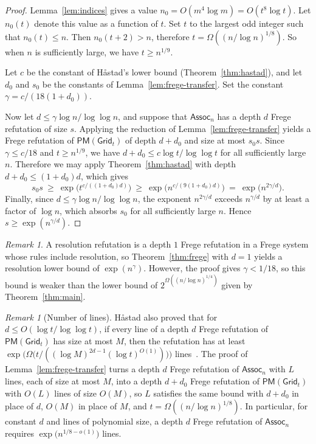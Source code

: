 \documentclass[11pt]{article}
\theoremstyle{definition}
\theoremstyle{remark}
\newtheorem{remark}[theorem]{Remark}
\newcommand{\Assoc}{\mathsf{Assoc}}
\newcommand{\PM}{\mathsf{PM}}
\newcommand{\Grid}{\mathsf{Grid}}
\begin{document}
\begin{proof}
Lemma~\ref{lem:indices} gives a value $n_0=O(m^4\log m)=O(t^8 \log t)$. Let $n_0(t)$ denote this value as a function of $t$.
Set $t$ to the largest odd integer such that $n_0(t)\le n$. Then $n_0(t+2) > n$, therefore $t=\Omega((n/\log n)^{1/8})$. So when $n$ is sufficiently large, we have $t \ge n^{1/9}$. 

Let $c$ be the constant of H\r{a}stad's lower bound (Theorem~\ref{thm:hastad}), and let $d_0$ and $s_0$ be the constants of Lemma~\ref{lem:frege-transfer}. Set the constant $\gamma=c/(18(1+d_0))$.

Now let $d\le\gamma\log n/\log\log n$, and suppose that $\Assoc_n$ has a depth $d$ Frege refutation of size $s$. 
Applying the reduction of Lemma~\ref{lem:frege-transfer} yields a Frege refutation of $\PM(\Grid_t)$ of depth $d+d_0$ and size at most $s_0s$. 
Since $\gamma\leq c/18$ and $t\ge n^{1/9}$, we have $d+d_0\le c\log t/\log\log t$ for all sufficiently large $n$. 
Therefore we may apply Theorem~\ref{thm:hastad} with depth $d+d_0 \le (1+d_0)d$, which gives
\[
s_0s\ \ge\ \exp\bigl(t^{c/((1+d_0)d)}\bigr)\ \ge\ \exp\bigl(n^{c/(9(1+d_0)d)}\bigr)\ =\ \exp\bigl(n^{2\gamma/d}\bigr).
\]
Finally, since $d\le\gamma\log n/\log\log n$, the exponent $n^{2\gamma/d}$ exceeds $n^{\gamma/d}$ by at least a factor of $\log n$, which absorbs $s_0$ for all sufficiently large $n$. 
Hence $s\ge\exp(n^{\gamma/d})$.
\end{proof}

\begin{remark}
\label{rem:frege-vs-res}
A resolution refutation is a depth $1$ Frege refutation in a Frege system whose rules include resolution, so Theorem~\ref{thm:frege} with $d=1$ yields a resolution lower bound of $\exp(n^{\gamma})$. However, the proof gives $\gamma<1/18$, so this bound is weaker than the lower bound of $2^{\Omega((n/\log n)^{1/4})}$ given by Theorem~\ref{thm:main}.
\end{remark}

\begin{remark}[Number of lines]
\label{rem:frege-lines}
H\r{a}stad also proved that for $d\le O(\log t/\log\log t)$, if every line of a depth $d$ Frege refutation of $\PM(\Grid_t)$ has size at most $M$, then the refutation has at least $\exp\bigl(\Omega\bigl(t/((\log M)^{2d-1}(\log t)^{O(1)})\bigr)\bigr)$ lines~\cite[Theorem~7.1]{hastad-php}. The proof of Lemma~\ref{lem:frege-transfer} turns a depth $d$ Frege refutation of $\Assoc_n$ with $L$ lines, each of size at most $M$, into a depth $d+d_0$ Frege refutation of $\PM(\Grid_t)$ with $O(L)$ lines of size $O(M)$, so $L$ satisfies the same bound with $d+d_0$ in place of $d$, $O(M)$ in place of $M$, and $t=\Omega((n/\log n)^{1/8})$. In particular, for constant $d$ and lines of polynomial size, a depth $d$ Frege refutation of $\Assoc_n$ requires $\exp\bigl(n^{1/8-o(1)}\bigr)$ lines.
\end{remark}
\end{document}
